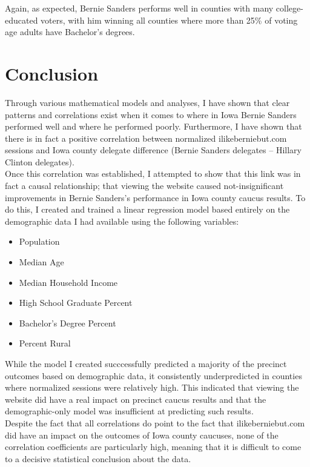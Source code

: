 \documentclass[11pt]{article}
\begin{document}
\begin{multicols}{2}

Again, as expected, Bernie Sanders performs well in counties with many college-educated voters, with him winning all counties where more than 25\% of voting age adults have Bachelor's degrees. \\

\section{Conclusion}

Through various mathematical models and analyses, I have shown that clear patterns and correlations exist when it comes to where in Iowa Bernie Sanders performed well and where he performed poorly. Furthermore, I have shown that there is in fact a positive correlation between normalized ilikeberniebut.com sessions and Iowa county delegate difference (Bernie Sanders delegates -- Hillary Clinton delegates). \\

Once this correlation was established, I attempted to show that this link was in fact a causal relationship; that viewing the website caused not-insignificant improvements in Bernie Sanders's performance in Iowa county caucus results. To do this, I created and trained a linear regression model based entirely on the demographic data I had available using the following variables:

\begin{itemize}
    \item Population 
    \item Median Age 
    \item Median Household Income
    \item High School Graduate Percent
    \item Bachelor's Degree Percent
    \item Percent Rural
\end{itemize}

While the model I created succcessfully predicted a majority of the precinct outcomes based on demographic data, it consistently underpredicted in counties where normalized sessions were relatively high. This indicated that viewing the website did have a real impact on precinct caucus results and that the demographic-only model was insufficient at predicting such results. \\

Despite the fact that all correlations do point to the fact that ilikeberniebut.com did have an impact on the outcomes of Iowa county caucuses, none of the correlation coefficients are particularly high, meaning that it is difficult to come to a decisive statistical conclusion about the data. \\


\end{multicols}
\end{document}
